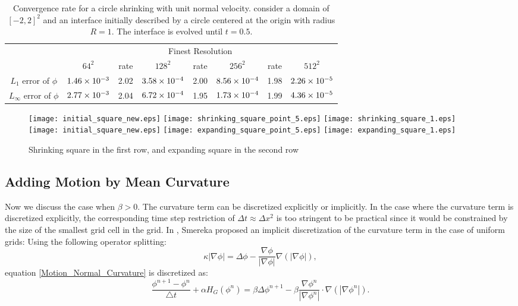 \documentclass[english]{article}
\begin{document}
\begin{table}
\begin{center}
\begin{tabular}{|c|c|c|c|c|c|c|c|}\hline
\multirow{2}{*}{} & \multicolumn{7}{|c|}{Finest Resolution}\\\cline{2-8}
                  & $64^2$ & rate & $128^2$ & rate & $256^2$ &rate & $512^2$ \\\hline
$L_1$      error of
$\phi$&$1.46\times 10^{-3}$&2.02&$3.58\times 10^{-4}$&2.00&$8.56\times 10^{-4}$&1.98&$2.26\times 10^{-5}$\\\hline $L_\infty$
error of $\phi$&$2.77\times 10^{-3}$&2.04&$6.72\times 10^{-4}$&1.95&$1.73\times 10^{-4}$&1.99&$4.36\times 10^{-5}$\\\hline
\end{tabular}
\end{center}
\caption{Convergence rate for a circle shrinking with unit normal velocity. consider a domain of
$[-2,2]^2$ and an interface initially described by a circle centered at the origin with radius
$R=1$. The interface is evolved until $t=0.5$.} \label{tab_shrinking_circle}
\end{table}
\begin{figure}
\begin{center}
\texttt{[image: initial\_square\_new.eps]}
\texttt{[image: shrinking\_square\_point\_5.eps]}
\texttt{[image: shrinking\_square\_1.eps]}\\
\texttt{[image: initial\_square\_new.eps]}
\texttt{[image: expanding\_square\_point\_5.eps]}
\texttt{[image: expanding\_square\_1.eps]}
\end{center}
\caption{Shrinking square in the first row, and expanding square in the second row}
\label{fig_shrinking_and_expading_square}
\end{figure}

\subsection{Adding Motion by Mean Curvature}
Now we discuss the case when $\beta>0$. The curvature term can be
discretized explicitly or implicitly. In the case where the curvature term
is discretized explicitly, the corresponding time step restriction of
$\Delta t \approx \Delta x^2$ is too stringent to be practical since it
would be constrained by the size of the smallest grid cell in the grid. In
\cite{Smereka:2003:Curvature}, Smereka proposed an implicit discretization
of the curvature term in the case of uniform grids: Using the following
operator splitting:
$$\kappa|\nabla\phi|=\Delta \phi -
\frac{\nabla\phi}{|\nabla\phi|}\nabla(|\nabla\phi|),$$ equation \eqref{Motion_Normal_Curvature} is
discretized as:
$$\frac{\phi^{n+1}-\phi^n}{\triangle t} +\alpha H_G(\phi^n) = \beta\Delta \phi^{n+1}
- \beta\frac{\nabla\phi^n}{|\nabla\phi^n|}\cdot\nabla(|\nabla\phi^n|).$$
\end{document}
